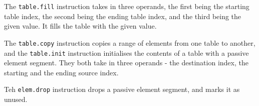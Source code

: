 The \texttt{table.fill} instruction takes in three operands, the first being the starting table index, the second being the ending table index, and the third being the given value. It fills the table with the given value. \vspace{1em}

The \texttt{table.copy} instruction copies a range of elements from one table to another, and the \texttt{table.init} instruction initialises the contents of a table with a passive element segment. They both take in three operands - the destination index, the starting and the ending source index. \vspace{1em}

Teh \texttt{elem.drop} instruction drops a passive element segment, and marks it as unused. \vspace{1em}

